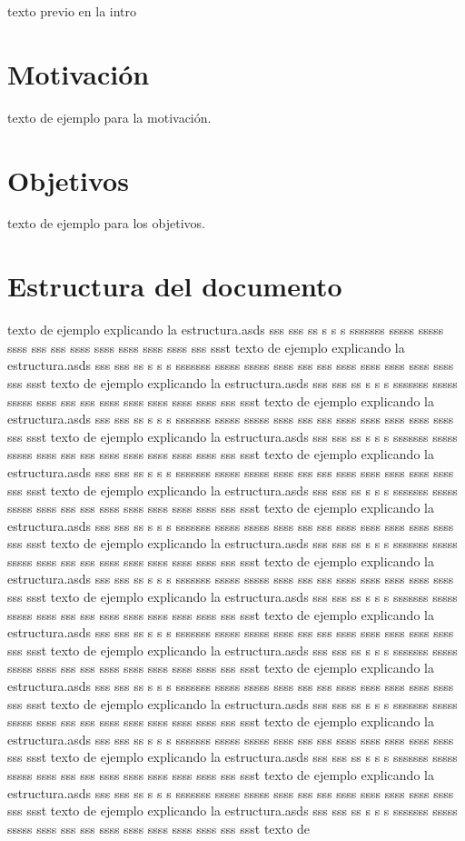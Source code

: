 texto previo en la intro

\section{Motivación}
texto de ejemplo para la motivación.

\section{Objetivos}
texto de ejemplo para los objetivos.

\section{Estructura del documento}
texto de ejemplo explicando la estructura.asds sss sss ss s s s sssssss sssss sssss ssss sss sss ssss ssss ssss ssss ssss sss ssst texto de ejemplo explicando la estructura.asds sss sss ss s s s sssssss sssss sssss ssss sss sss ssss ssss ssss ssss ssss sss ssst texto de ejemplo explicando la estructura.asds sss sss ss s s s sssssss sssss sssss ssss sss sss ssss ssss ssss ssss ssss sss ssst texto de ejemplo explicando la estructura.asds sss sss ss s s s sssssss sssss sssss ssss sss sss ssss ssss ssss ssss ssss sss ssst texto de ejemplo explicando la estructura.asds sss sss ss s s s sssssss sssss sssss ssss sss sss ssss ssss ssss ssss ssss sss ssst texto de ejemplo explicando la estructura.asds sss sss ss s s s sssssss sssss sssss ssss sss sss ssss ssss ssss ssss ssss sss ssst texto de ejemplo explicando la estructura.asds sss sss ss s s s sssssss sssss sssss ssss sss sss ssss ssss ssss ssss ssss sss ssst texto de ejemplo explicando la estructura.asds sss sss ss s s s sssssss sssss sssss ssss sss sss ssss ssss ssss ssss ssss sss ssst texto de ejemplo explicando la estructura.asds sss sss ss s s s sssssss sssss sssss ssss sss sss ssss ssss ssss ssss ssss sss ssst texto de ejemplo explicando la estructura.asds sss sss ss s s s sssssss sssss sssss ssss sss sss ssss ssss ssss ssss ssss sss ssst texto de ejemplo explicando la estructura.asds sss sss ss s s s sssssss sssss sssss ssss sss sss ssss ssss ssss ssss ssss sss ssst texto de ejemplo explicando la estructura.asds sss sss ss s s s sssssss sssss sssss ssss sss sss ssss ssss ssss ssss ssss sss ssst texto de ejemplo explicando la estructura.asds sss sss ss s s s sssssss sssss sssss ssss sss sss ssss ssss ssss ssss ssss sss ssst texto de ejemplo explicando la estructura.asds sss sss ss s s s sssssss sssss sssss ssss sss sss ssss ssss ssss ssss ssss sss ssst texto de ejemplo explicando la estructura.asds sss sss ss s s s sssssss sssss sssss ssss sss sss ssss ssss ssss ssss ssss sss ssst texto de ejemplo explicando la estructura.asds sss sss ss s s s sssssss sssss sssss ssss sss sss ssss ssss ssss ssss ssss sss ssst texto de ejemplo explicando la estructura.asds sss sss ss s s s sssssss sssss sssss ssss sss sss ssss ssss ssss ssss ssss sss ssst texto de ejemplo explicando la estructura.asds sss sss ss s s s sssssss sssss sssss ssss sss sss ssss ssss ssss ssss ssss sss ssst texto de ejemplo explicando la estructura.asds sss sss ss s s s sssssss sssss sssss ssss sss sss ssss ssss ssss ssss ssss sss ssst texto de 
